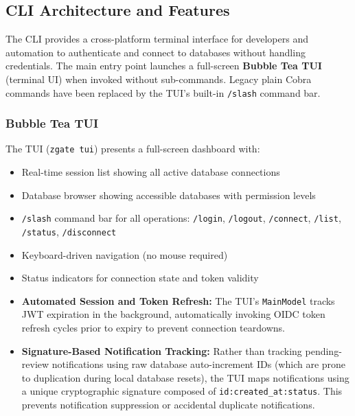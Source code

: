 \subsection{CLI Architecture and Features}
\label{subsec:cli-architecture}

The CLI provides a cross-platform terminal interface for developers and automation to authenticate and connect to databases without handling credentials. The main entry point launches a full-screen \textbf{Bubble Tea TUI} (terminal UI) when invoked without sub-commands. Legacy plain Cobra commands have been replaced by the TUI's built-in \texttt{/slash} command bar.

\subsubsection{Bubble Tea TUI}

The TUI (\texttt{zgate tui}) presents a full-screen dashboard with:

\begin{itemize}[leftmargin=*]
    \item Real-time session list showing all active database connections
    \item Database browser showing accessible databases with permission levels
    \item \texttt{/slash} command bar for all operations: \texttt{/login}, \texttt{/logout}, \texttt{/connect}, \texttt{/list}, \texttt{/status}, \texttt{/disconnect}
    \item Keyboard-driven navigation (no mouse required)
    \item Status indicators for connection state and token validity
    \item \textbf{Automated Session and Token Refresh:} The TUI's \texttt{MainModel} tracks JWT expiration in the background, automatically invoking OIDC token refresh cycles prior to expiry to prevent connection teardowns.
    \item \textbf{Signature-Based Notification Tracking:} Rather than tracking pending-review notifications using raw database auto-increment IDs (which are prone to duplication during local database resets), the TUI maps notifications using a unique cryptographic signature composed of \texttt{id:created\_at:status}. This prevents notification suppression or accidental duplicate notifications.
\end{itemize}

